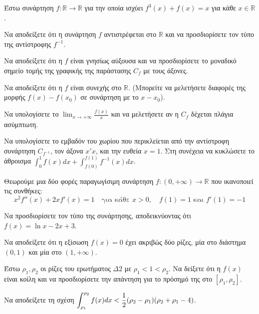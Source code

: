 \documentclass[a4paper,11pt,twoside]{article}
\newcommand{\kerkissans}[1]{{\fontfamily{maksf}\selectfont {#1}}}
\newcommand\themanum{A}
\newcounter{thema}[section]
\renewcommand{\thethema}{\arabic{thema}}
\newcommand{\Thema}{\refstepcounter{thema}{\textbf{\textcolor{black}{\faPenSquare\ \  \large \kerkissans{\textbf{\thethemaο\hspace{2mm}Θέμα}}}}}\hspace{0mm}}{}
\newenvironment{thema}[1]
{\begin{tcolorbox}[title=\Thema\kerkissans{\textbf{\large{  #1}}},breakable,
enhanced standard,titlerule=0pt,toprule=0pt, rightrule=0pt, bottomrule=0pt,
colback=white,left=0mm,top=1mm,bottom=0mm,
boxrule=0pt,
colframe=white,leftrule=0mm,sharp corners,coltitle=black]
\renewcommand{\themanum}{#1}}
{\end{tcolorbox}}
\newcommand{\dint}{\displaystyle\int}
\begin{document}
\begin{thema}{Δ}
Έστω συνάρτηση $f:\mathbb{R}\to\mathbb{R}$ για την οποία ισχύει $f^3(x) + f(x) = x$ για κάθε $x \in \mathbb{R}$.
\begin{erwthma}
    \item Να αποδείξετε ότι η συνάρτηση $f$ αντιστρέφεται στο $\mathbb{R}$ και να προσδιορίσετε τον τύπο της αντίστροφης $f^{-1}$.
    \item Να αποδείξετε ότι η $f$ είναι γνησίως αύξουσα και να προσδιορίσετε το μοναδικό σημείο τομής της γραφικής της παράστασης $C_f$ με τους άξονες.
    \item Να αποδείξετε ότι η $f$ είναι συνεχής στο $\mathbb{R}$. (Μπορείτε να μελετήσετε διαφορές της μορφής $f(x)-f(x_0)$ σε συνάρτηση με το $x-x_0$).
    \item Να υπολογίσετε το $\displaystyle\lim_{x\to +\infty} \frac{f(x)}{x}$ και να μελετήσετε αν η $C_f$ δέχεται πλάγια ασύμπτωτη.
    \item Να υπολογίσετε το εμβαδόν του χωρίου που περικλείεται από την αντίστροφη συνάρτηση $C_{f^{-1}}$, τον άξονα $x'x$, και την ευθεία $x=1$. Στη συνέχεια να κυκλώσετε το άθροισμα $\dint_0^{1} f(x)dx + \dint_{f(0)}^{f(1)} f^{-1}(x)dx$.
\end{erwthma}
\end{thema}

\begin{thema}{Δ}
Θεωρούμε μια δύο φορές παραγωγίσιμη συνάρτηση $f: (0, +\infty) \to \mathbb{R}$ που ικανοποιεί τις συνθήκες:
\[ x^2 f''(x) + 2x f'(x) = 1 \quad \text{για κάθε } x > 0, \quad f(1)=1 \text{ και } f'(1)=-1 \]
\begin{erwthma}
    \item Να προσδιορίσετε τον τύπο της συνάρτησης, αποδεικνύοντας ότι $f(x) = \ln x - 2x + 3$.
    \item Να αποδείξετε ότι η εξίσωση $f(x) = 0$ έχει ακριβώς δύο ρίζες, μία στο διάστημα $(0,1)$ και μία στο $(1, +\infty)$.
    \item Έστω $\rho_1, \rho_2$ οι ρίζες του ερωτήματος $\Delta 2$ με $\rho_1 < 1 < \rho_2$. Να δείξετε ότι η $f(x)$ είναι κοίλη και να προσδιορίσετε την απάντηση για το πρόσημό της στο $[\rho_1, \rho_2]$.
    \item Να αποδείξετε τη σχέση $\displaystyle \dint_{\rho_1}^{\rho_2} f(x) dx < \frac{1}{2}(\rho_2 - \rho_1)(\rho_2 + \rho_1 - 4)$.
\end{erwthma}
\end{thema}
\end{document}
